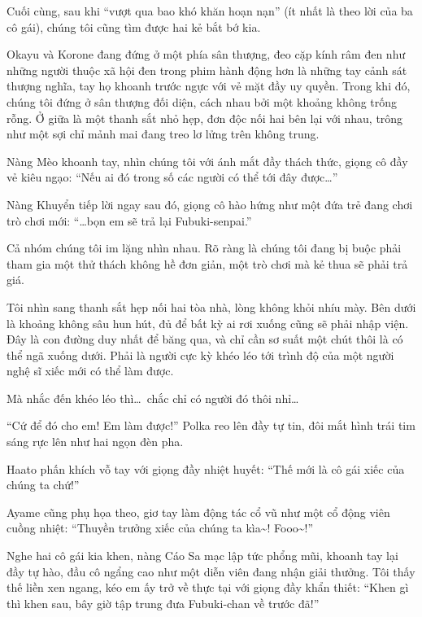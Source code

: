 \documentclass[../main.tex]{subfiles}
\begin{document}
\ct

Cuối cùng, sau khi ``vượt qua bao khó khăn hoạn nạn'' (ít nhất là theo lời của ba cô gái), chúng tôi cũng tìm được hai kẻ bắt bớ kia.

Okayu và Korone đang đứng ở một phía sân thượng, đeo cặp kính râm đen như những người thuộc xã hội đen trong phim hành động hơn là những tay cảnh sát thượng nghĩa, tay họ khoanh trước ngực với vẻ mặt đầy uy quyền. Trong khi đó, chúng tôi đứng ở sân thượng đối diện, cách nhau bởi một khoảng không trống rỗng. Ở giữa là một thanh sắt nhỏ hẹp, đơn độc nối hai bên lại với nhau, trông như một sợi chỉ mảnh mai đang treo lơ lửng trên không trung.


Nàng Mèo khoanh tay, nhìn chúng tôi với ánh mắt đầy thách thức, giọng cô đầy vẻ kiêu ngạo: ``Nếu ai đó trong số các người có thể tới đây được\dots''

Nàng Khuyển tiếp lời ngay sau đó, giọng cô hào hứng như một đứa trẻ đang chơi trò chơi mới: ``\dots bọn em sẽ trả lại Fubuki-senpai.''

Cả nhóm chúng tôi im lặng nhìn nhau. Rõ ràng là chúng tôi đang bị buộc phải tham gia một thử thách không hề đơn giản, một trò chơi mà kẻ thua sẽ phải trả giá.

Tôi nhìn sang thanh sắt hẹp nối hai tòa nhà, lòng không khỏi nhíu mày. Bên dưới là khoảng không sâu hun hút, đủ để bất kỳ ai rơi xuống cũng sẽ phải nhập viện. Đây là con đường duy nhất để băng qua, và chỉ cần sơ suất một chút thôi là có thể ngã xuống dưới. Phải là người cực kỳ khéo léo tới trình độ của một người nghệ sĩ xiếc mới có thể làm được.

Mà nhắc đến khéo léo thì\dots\ chắc chỉ có người đó thôi nhỉ\dots

``Cứ để đó cho em! Em làm được!'' Polka reo lên đầy tự tin, đôi mắt hình trái tim sáng rực lên như hai ngọn đèn pha.

Haato phấn khích vỗ tay với giọng đầy nhiệt huyết: ``Thế mới là cô gái xiếc của chúng ta chứ!''

Ayame cũng phụ họa theo, giơ tay làm động tác cổ vũ như một cổ động viên cuồng nhiệt: ``Thuyền trưởng xiếc của chúng ta kìa\~{}! Fooo\~{}!''

Nghe hai cô gái kia khen, nàng Cáo Sa mạc lập tức phổng mũi, khoanh tay lại đầy tự hào, đầu cô ngẩng cao như một diễn viên đang nhận giải thưởng. Tôi thấy thế liền xen ngang, kéo em ấy trở về thực tại với giọng đầy khẩn thiết: ``Khen gì thì khen sau, bây giờ tập trung đưa Fubuki-chan về trước đã!''
\end{document}
